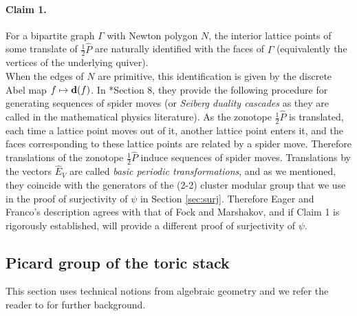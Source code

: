 \documentclass[11pt]{article} %
\theoremstyle{definition}
\begin{document}
\paragraph{Claim 1.}
For a bipartite graph $\Gamma$ with Newton polygon $N$, the interior lattice points of some translate of $\frac{1}{2}\widehat{P}$ are naturally identified with the faces of $\Gamma$ (equivalently the vertices of the underlying quiver). \\


When the edges of $N$ are primitive, this identification is given by the discrete Abel map $f \mapsto {\bf d}(f)$. In \cite{EF}*{Section 8}, they provide the following procedure for generating sequences of spider moves (or \textit{Seiberg duality cascades} as they are called in the mathematical physics literature). As the zonotope $\frac 1 2 \widehat P$ is translated, each time a lattice point moves out of it, another lattice point enters it, and the faces corresponding to these lattice points are related by a spider move. Therefore translations of the zonotope $\frac 1 2 \widehat P$ induce sequences of spider moves. Translations by the vectors $\widehat E_V$ are called \textit{basic periodic transformations}, and as we mentioned, they coincide with the generators of the (2-2) cluster modular group that we use in the proof of surjectivity of $\psi$ in Section \ref{sec:surj}. Therefore Eager and Franco's description agrees with that of Fock and Marshakov, and if Claim 1 is rigorously established, will provide a different proof of surjectivity of $\psi$. 
\subsection{Picard group of the toric stack}\label{picstack}
This section uses technical notions from algebraic geometry and we refer the reader to \cite{TWZ18} for further background. 
\end{document}
